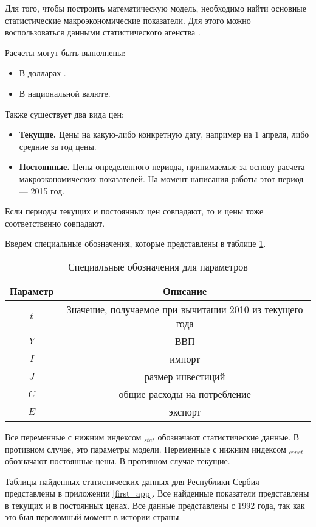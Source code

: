 
Для того, чтобы построить математическую модель, необходимо найти основные статистические макроэкономические показатели.
Для этого можно воспользоваться данными статистического агенства \cite{unstat}.

Расчеты могут быть выполнены:
\begin{itemize}
	\item В долларах .
	\item В национальной валюте.
\end{itemize}

Также существует два вида цен:
\begin{itemize}
	\item \textbf{Текущие.}
	Цены на какую-либо конкретную дату, например на 1 апреля, либо средние за год цены.
	\item \textbf{Постоянные.}
	Цены определенного периода, принимаемые за основу расчета макроэкономических показателей.
	На момент написания работы этот период --- 2015 год.
\end{itemize}
Если периоды текущих и постоянных цен совпадают, то и цены тоже соответственно совпадают.

Введем специальные обозначения, которые представлены в таблице \ref{desig_of_params}.

\begin{table}[]
	\centering
	\begin{tabular}{|c|c|}
	\hline
	\multicolumn{1}{|c|}{Параметр} & \multicolumn{1}{c|}{Описание} \\ \hline
	$t$                          &Значение, получаемое при вычитании 2010 из текущего года\\
	$Y$                          & ВВП                                                   \\
	$I$                          & импорт                                                \\
	$J$                          & размер инвестиций                                     \\
	$C$                          & общие расходы на потребление                          \\
	$E$                          & экспорт                                               \\ \hline
\end{tabular}
\caption{Специальные обозначения для параметров}\label{desig_of_params}
\end{table}

Все переменные с нижним индексом $_{stat}$ обозначают статистические данные.
В противном случае, это параметры модели.
Переменные с нижним индексом $_{const}$ обозначают постоянные цены.
В противном случае текущие.

Таблицы найденных статистических данных для Республики Сербия  представлены в приложении \ref{first_app}.
Все найденные показатели представлены в текущих и в постоянных ценах.
Все данные представлены с 1992 года, так как это был переломный момент в истории страны.

